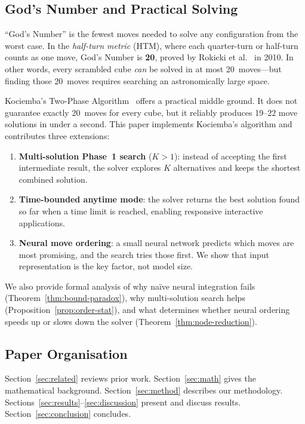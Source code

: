 \documentclass[graybox]{svmult}
\begin{document}
\subsection{God's Number and Practical Solving}
``God's Number'' is the fewest moves needed to solve any configuration from the worst case. In the \emph{half-turn metric} (HTM), where each quarter-turn or half-turn counts as one move, God's Number is \textbf{20}, proved by Rokicki et al.~\cite{godnumber} in 2010. In other words, every scrambled cube \emph{can} be solved in at most 20~moves---but finding those 20~moves requires searching an astronomically large space.

Kociemba's Two-Phase Algorithm~\cite{kociemba} offers a practical middle ground. It does not guarantee exactly 20~moves for every cube, but it reliably produces 19--22 move solutions in under a second. This paper implements Kociemba's algorithm and contributes three extensions:

\begin{enumerate}[leftmargin=*]
  \item \textbf{Multi-solution Phase~1 search} ($K > 1$): instead of accepting the first intermediate result, the solver explores $K$ alternatives and keeps the shortest combined solution.
  \item \textbf{Time-bounded anytime mode}: the solver returns the best solution found so far when a time limit is reached, enabling responsive interactive applications.
  \item \textbf{Neural move ordering}: a small neural network predicts which moves are most promising, and the search tries those first. We show that input representation is the key factor, not model size.
\end{enumerate}

We also provide formal analysis of why na\"ive neural integration fails (Theorem~\ref{thm:bound-paradox}), why multi-solution search helps (Proposition~\ref{prop:order-stat}), and what determines whether neural ordering speeds up or slows down the solver (Theorem~\ref{thm:node-reduction}).

\subsection{Paper Organisation}
Section~\ref{sec:related} reviews prior work. Section~\ref{sec:math} gives the mathematical background. Section~\ref{sec:method} describes our methodology. Sections~\ref{sec:results}--\ref{sec:discussion} present and discuss results. Section~\ref{sec:conclusion} concludes.
\end{document}

